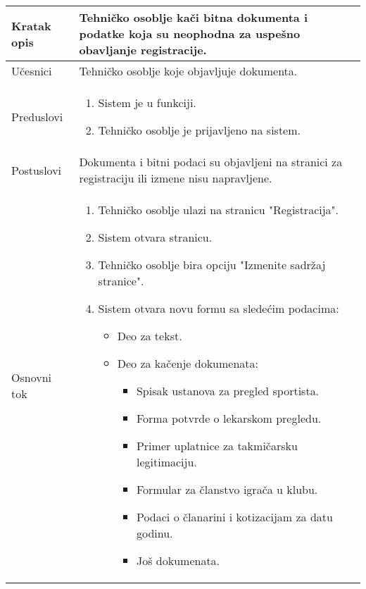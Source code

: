 \documentclass{article}
\begin{document}
 \begin{longtable}{| p{} | p{} |} 
            \hline
                Kratak opis & Tehničko osoblje kači bitna dokumenta i podatke koja su neophodna za uspešno obavljanje registracije. \\ 
            \hline    
                Učesnici & Tehničko osoblje koje objavljuje dokumenta.\\
            \hline
               Preduslovi & \begin{enumerate}
                   \item Sistem je u funkciji.
                   \item Tehničko osoblje je prijavljeno na sistem. 
                \end{enumerate}\\
            \hline  
                Postuslovi & Dokumenta i bitni podaci su objavljeni na stranici za registraciju ili izmene nisu napravljene.\\
            \hline
                Osnovni tok & \begin{enumerate}
                    \item Tehničko osoblje ulazi na stranicu "Registracija".
                    \item Sistem otvara stranicu.
                    \item Tehničko osoblje bira opciju "Izmenite sadržaj stranice".
                    \item Sistem otvara novu formu sa sledećim podacima:
                    \begin{itemize}
                        \item Deo za tekst.
                        \item Deo za kačenje dokumenata:
                        \begin{itemize}
                            \item Spisak ustanova za pregled sportista.
                            \item Forma potvrde o lekarskom pregledu. 
                            \item Primer uplatnice za takmičarsku legitimaciju.
                            \item Formular za članstvo igrača u klubu. 
                            \item Podaci o članarini i kotizacijam za datu godinu.
                            \item Još dokumenata.
                        \end{itemize}

\end{itemize}
\end{enumerate}
\end{longtable}
\end{document}
